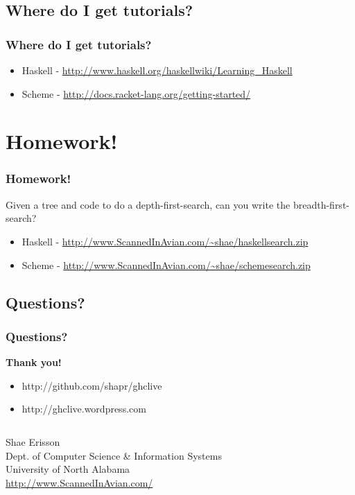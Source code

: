 \documentclass[xcolor=pdftex,dvipsnames,table]{beamer}
\begin{document}
\subsection{Where do I get tutorials?}
\begin{frame}
  \frametitle{Where do I get tutorials?}
  \begin{itemize}
  \item Haskell - \url{http://www.haskell.org/haskellwiki/Learning_Haskell}
  \item Scheme - \url{http://docs.racket-lang.org/getting-started/}
  \end{itemize}
\end{frame}

\section{Homework!}
\begin{frame}
  \frametitle{Homework!}
  Given a tree and code to do a depth-first-search, can you write the breadth-first-search?
  \begin{itemize}
  \item Haskell - \url{http://www.ScannedInAvian.com/~shae/haskellsearch.zip}
  \item Scheme - \url{http://www.ScannedInAvian.com/~shae/schemesearch.zip}
  \end{itemize}
\end{frame}

\subsection{Questions?}
\begin{frame}[plain]
  \label{thanks}
  \frametitle{Questions?}
  \begin{center}
    \textbf{Thank you!}
  \end{center}
  \begin{itemize}
  \item http://github.com/shapr/ghclive
  \item http://ghclive.wordpress.com
  \end{itemize}
  \vspace{0.5cm}
  \begin{center}
    \begin{minipage}{11cm}
      \begin{columns}[c]
        Shae Erisson\\
        Dept. of Computer Science \& Information Systems\\
        University of North Alabama\\
        \url{http://www.ScannedInAvian.com/}
      \end{columns}
    \end{minipage}
  \end{center}
\end{frame}


\end{document}
